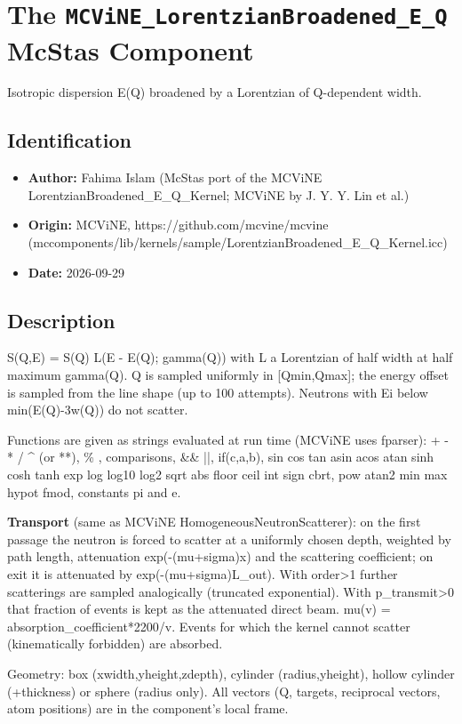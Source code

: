\section{The \texttt{MCViNE\_LorentzianBroadened\_E\_Q} McStas Component}
Isotropic dispersion E(Q) broadened by a Lorentzian of Q-dependent width.

\subsection*{Identification}
\begin{itemize}
  \item \textbf{Author:} Fahima Islam (McStas port of the MCViNE LorentzianBroadened\_E\_Q\_Kernel; MCViNE by J. Y. Y. Lin et al.)
  \item \textbf{Origin:} MCViNE, https://github.com/mcvine/mcvine (mccomponents/lib/kernels/sample/LorentzianBroadened\_E\_Q\_Kernel.icc)
  \item \textbf{Date:} 2026-09-29
\end{itemize}

\subsection*{Description}
S(Q,E) = S(Q) L(E - E(Q); gamma(Q)) with L a Lorentzian of half width at half maximum gamma(Q). Q is sampled uniformly in [Qmin,Qmax]; the energy offset is sampled from the line shape (up to 100 attempts). Neutrons with Ei below min(E(Q)-3w(Q)) do not scatter.

Functions are given as strings evaluated at run time (MCViNE uses fparser): + - * / \textasciicircum{} (or **), \% , comparisons, \&\& ||, if(c,a,b), sin cos tan asin acos atan sinh cosh tanh exp log log10 log2 sqrt abs floor ceil int sign cbrt, pow atan2 min max hypot fmod, constants pi and e.

\textbf{Transport} (same as MCViNE HomogeneousNeutronScatterer): on the first passage the neutron is forced to scatter at a uniformly chosen depth, weighted by path length, attenuation exp(-(mu+sigma)x) and the scattering coefficient; on exit it is attenuated by exp(-(mu+sigma)L\_out). With order\textgreater{}1 further scatterings are sampled analogically (truncated exponential). With p\_transmit\textgreater{}0 that fraction of events is kept as the attenuated direct beam. mu(v) = absorption\_coefficient*2200/v. Events for which the kernel cannot scatter (kinematically forbidden) are absorbed.

Geometry: box (xwidth,yheight,zdepth), cylinder (radius,yheight), hollow cylinder (+thickness) or sphere (radius only). All vectors (Q, targets, reciprocal vectors, atom positions) are in the component's local frame.

